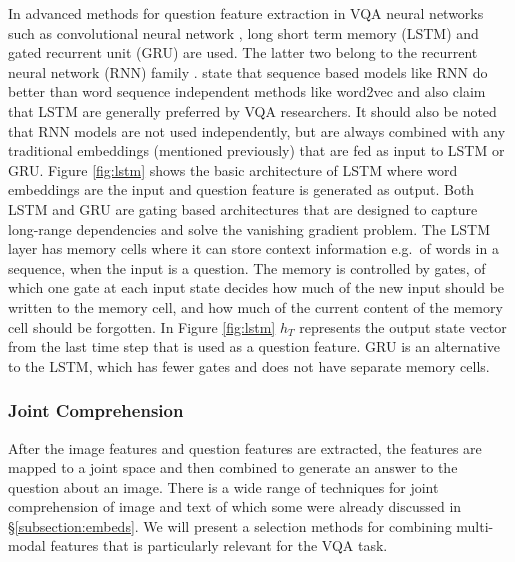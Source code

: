 \documentclass{article}
\begin{document}
In advanced methods for question feature extraction in VQA neural networks such as convolutional neural network \citep{krizhevsky2012imagenet}, long short term memory (LSTM) \citep{lstm} and gated recurrent unit (GRU) \citep{cho2014gru} are used. The latter two belong to the recurrent neural network (RNN) family \citep{elman1990finding}. \cite{young2018recent} state that sequence based models like RNN do better than word sequence independent methods like word2vec and also claim that LSTM are generally preferred by VQA researchers. It should also be noted that RNN models are not used independently, but are always combined with any traditional embeddings (mentioned previously) that are fed as input to LSTM or GRU. Figure \ref{fig:lstm} shows the basic architecture of LSTM where word embeddings are the input and question feature is generated as output. Both LSTM and GRU are gating based architectures that are designed to capture long-range dependencies and solve the vanishing gradient problem. The LSTM layer has memory cells where it can store context information e.g.\ of words in a sequence, when the input is a question. The memory is controlled by gates, of which one gate at each input state decides how much of the new input should be written to the memory cell, and how much of the current content of the memory cell should be forgotten. In Figure \ref{fig:lstm} $h_T$ represents the output state vector from the last time step that is used as a question feature. GRU is an alternative to the LSTM, which has fewer gates and does not have separate memory cells.

\subsubsection{Joint Comprehension} \label{subsubsection:attention}

After the image features and question features are extracted, the features are mapped to a joint space and then combined to generate an answer to the question about an image. There is a wide range of techniques for joint comprehension of image and text of which some were already discussed in \S \ref{subsection:embeds}. We will present a selection methods for combining multi-modal features that is particularly relevant for the VQA task.
\end{document}
